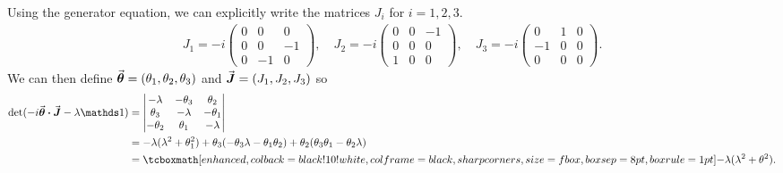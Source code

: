 Using the generator equation, we can explicitly write the matrices $J_{i}$ for $i = 1,2,3$.
\begin{eqnarray}
    \label{eq:J-matrices}
    J_{1} = -i
    \begin{pmatrix}
    0 & 0 & 0 \\
    0 & 0 & -1 \\
    0 & -1 & 0
    \end{pmatrix},
    \quad
    J_{2} = -i
    \begin{pmatrix}
    0 & 0 & -1 \\
    0 & 0 & 0 \\
    1 & 0 & 0
    \end{pmatrix},
    \quad
    J_{3} = -i
    \begin{pmatrix}
    0 & 1 & 0 \\
    -1 & 0 & 0 \\
    0 & 0 & 0
    \end{pmatrix}
.\end{eqnarray}
We can then define $\va*{\theta} = (\theta_1,\theta_2,\theta_3)$ and $\va*{J} = (J_1,J_2,J_3)$ so
\begin{align}
    \label{eq:characteristic-eq}
    {\rm det}(-i \va*{\theta} \vdot \va*{J} - \lambda \id) &= 
    \begin{vmatrix}
        -\lambda & -\theta_3 & \theta_2 \\
        \theta_3 & -\lambda & -\theta_1 \\
        -\theta_2 & \theta_1 & -\lambda
    \end{vmatrix}
    \notag \\
                                                           &=
    -\lambda(\lambda^2 + \theta_1^2) + \theta_3(-\theta_3\lambda - \theta_1\theta_2) + \theta_2(\theta_3\theta_1 - \theta_2\lambda) \notag \\
                                                           &= \eqbox{-\lambda(\lambda^2 + \theta^2)}
.\end{align}




